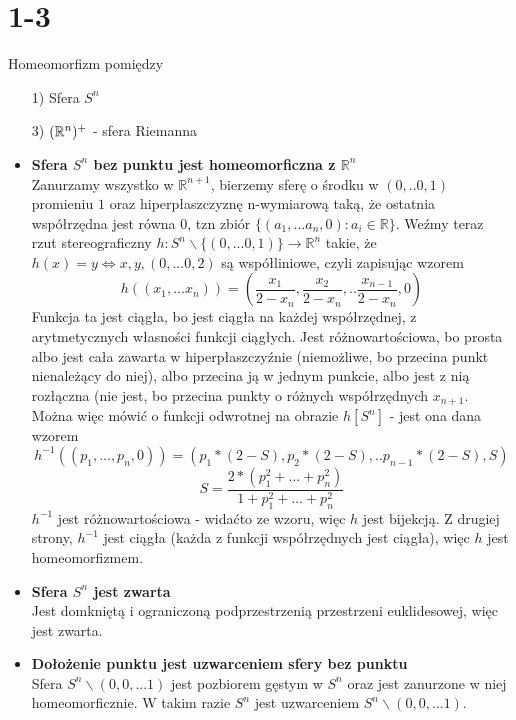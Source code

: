 \section*{1-3}
Homeomorfizm pomiędzy
\begin{itemize}
  \item[1)] Sfera $S^n$
  \item[3)] $({\mathbb{R}}^n)^+$ - sfera Riemanna
\end{itemize}
\begin{itemize}
\item \textbf{Sfera $S^n$ bez punktu jest homeomorficzna z $\mathbb{R}^n$}\\
Zanurzamy wszystko w $\mathbb{R}^{n+1}$, bierzemy sferę o środku w $(0, .. 0, 1)$ promieniu $1$ oraz hiperpłaszczyznę n-wymiarową taką, że ostatnia współrzędna jest równa $0$, tzn zbiór $\{(a_1, ... a_n, 0): a_i \in \mathbb{R}\}$.
Weźmy teraz rzut stereograficzny $h: S^n \backslash \{(0, ... 0, 1)\} \rightarrow \mathbb{R}^n$ takie, że $h(x) = y \iff x, y, (0, ... 0, 2)$ są współliniowe, czyli zapisując wzorem
$$
h((x_1, ... x_n)) = (\frac{x_1}{2-x_n}, \frac{x_2}{2-x_n}, .. \frac{x_{n-1}}{2-x_n}, 0)
$$
Funkcja ta jest ciągła, bo jest ciągła na każdej współrzędnej, z arytmetycznych własności funkcji ciągłych.
Jest różnowartościowa, bo prosta albo jest cała zawarta w hiperpłaszczyźnie (niemożliwe, bo przecina punkt nienależący do niej), albo przecina ją w jednym punkcie, albo jest z nią rozłączna (nie jest, bo przecina punkty o różnych współrzędnych $x_{n+1}$.
Można więc mówić o funkcji odwrotnej na obrazie $h[S^n]$ - jest ona dana wzorem
$$
h^{-1}((p_1, ... , p_n, 0)) = (p_1 * (2-S), p_2*(2-S), .. p_{n-1} * (2-S), S)
$$
$$
S = \frac{2*(p_1^2 + ... + p_n^2)}{1 + p_1^2 + ... + p_n^2}
$$
$h^{-1}$ jest różnowartościowa - widaćto ze wzoru, więc $h$ jest bijekcją.
Z drugiej strony, $h^{-1}$ jest ciągła (każda z funkcji współrzędnych jest ciągła), więc $h$ jest homeomorfizmem.

\item \textbf{Sfera $S^n$ jest zwarta}\\
Jest domkniętą i ograniczoną podprzestrzenią przestrzeni euklidesowej, więc jest zwarta.

\item \textbf{Dołożenie punktu jest uzwarceniem sfery bez punktu}\\
Sfera $S^n \backslash (0, 0, ... 1)$ jest pozbiorem gęstym w $S^n$ oraz jest zanurzone w niej homeomorficznie. W takim razie $S^n$ jest uzwarceniem $S^n \backslash (0, 0, ... 1)$.


\end{itemize}
